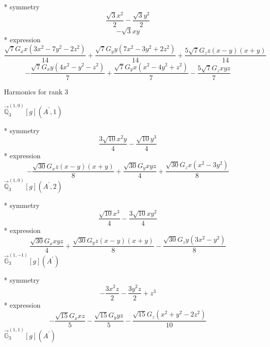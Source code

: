 \documentclass[fleqn,8pt]{jsarticle}
\begin{document}
\noindent\quad ** symmetry
\begin{dmath*}
\frac{\sqrt{3} x^{2}}{2} - \frac{\sqrt{3} y^{2}}{2}
\end{dmath*}
\begin{dmath*}
- \sqrt{3} x y
\end{dmath*}
\noindent\quad ** expression
\begin{dmath*}
\frac{\sqrt{7} G_{x} x \left(3 x^{2} - 7 y^{2} - 2 z^{2}\right)}{14} + \frac{\sqrt{7} G_{y} y \left(7 x^{2} - 3 y^{2} + 2 z^{2}\right)}{14} + \frac{5 \sqrt{7} G_{z} z \left(x - y\right) \left(x + y\right)}{14}
\end{dmath*}
\begin{dmath*}
- \frac{\sqrt{7} G_{x} y \left(4 x^{2} - y^{2} - z^{2}\right)}{7} + \frac{\sqrt{7} G_{y} x \left(x^{2} - 4 y^{2} + z^{2}\right)}{7} - \frac{5 \sqrt{7} G_{z} x y z}{7}
\end{dmath*}

\noindent * Harmonics for rank 3

\noindent\quad $\vec{\mathbb{Q}}_{3}^{(1,0)}[g](A^{\prime},1)$

\noindent\quad ** symmetry
\begin{dmath*}
\frac{3 \sqrt{10} x^{2} y}{4} - \frac{\sqrt{10} y^{3}}{4}
\end{dmath*}
\noindent\quad ** expression
\begin{dmath*}
- \frac{\sqrt{30} G_{x} z \left(x - y\right) \left(x + y\right)}{8} + \frac{\sqrt{30} G_{y} x y z}{4} + \frac{\sqrt{30} G_{z} x \left(x^{2} - 3 y^{2}\right)}{8}
\end{dmath*}
\noindent\quad $\vec{\mathbb{Q}}_{3}^{(1,0)}[g](A^{\prime},2)$

\noindent\quad ** symmetry
\begin{dmath*}
\frac{\sqrt{10} x^{3}}{4} - \frac{3 \sqrt{10} x y^{2}}{4}
\end{dmath*}
\noindent\quad ** expression
\begin{dmath*}
\frac{\sqrt{30} G_{x} x y z}{4} + \frac{\sqrt{30} G_{y} z \left(x - y\right) \left(x + y\right)}{8} - \frac{\sqrt{30} G_{z} y \left(3 x^{2} - y^{2}\right)}{8}
\end{dmath*}
\noindent\quad $\vec{\mathbb{G}}_{3}^{(1,-1)}[g](A^{\prime})$

\noindent\quad ** symmetry
\begin{dmath*}
- \frac{3 x^{2} z}{2} - \frac{3 y^{2} z}{2} + z^{3}
\end{dmath*}
\noindent\quad ** expression
\begin{dmath*}
- \frac{\sqrt{15} G_{x} x z}{5} - \frac{\sqrt{15} G_{y} y z}{5} - \frac{\sqrt{15} G_{z} \left(x^{2} + y^{2} - 2 z^{2}\right)}{10}
\end{dmath*}
\noindent\quad $\vec{\mathbb{G}}_{3}^{(1,1)}[g](A^{\prime})$
\end{document}
